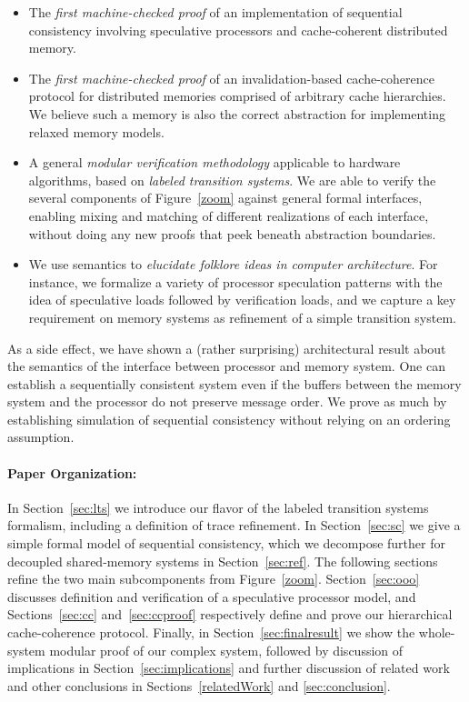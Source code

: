 \begin{itemize} 

\item The \emph{first machine-checked proof} of an implementation of sequential
  consistency involving speculative processors and cache-coherent distributed
  memory.

\item The \emph{first machine-checked proof} of an invalidation-based
  cache-coherence protocol for distributed memories comprised of arbitrary
  cache hierarchies. We believe such a memory is also the correct abstraction for
  implementing relaxed memory models.

\item A general \emph{modular verification methodology} applicable to hardware
  algorithms, based on \emph{labeled transition systems}.  We are able to verify
  the several components of Figure~\ref{zoom} against general formal interfaces,
  enabling mixing and matching of different realizations of each interface,
  without doing any new proofs that peek beneath abstraction boundaries.

\item We use semantics to \emph{elucidate folklore ideas in computer architecture}.
  For instance, we formalize a variety of processor speculation patterns with
  the idea of speculative loads followed by verification loads, and we capture
  a key requirement on memory systems as refinement of a simple transition
  system.

\end{itemize}

As a side effect, we %
have shown a (rather surprising) architectural result about the semantics of
the interface between processor and memory system. One can establish a
sequentially consistent system even if the buffers between the memory system
and the processor do not preserve message order. We prove as much by
establishing simulation of sequential consistency without relying on an
ordering assumption.

\paragraph{Paper Organization:} In Section~\ref{sec:lts} we introduce
our flavor of the labeled transition systems formalism,
including a definition of trace refinement. In
Section~\ref{sec:sc} we give a simple formal model of sequential consistency,
which we decompose further for decoupled shared-memory systems in Section~\ref{sec:ref}.
The following sections refine the two main subcomponents from Figure~\ref{zoom}.
Section~\ref{sec:ooo} discusses definition and verification of a
speculative processor model, and Sections~\ref{sec:cc} and~\ref{sec:ccproof}
respectively define and prove our hierarchical cache-coherence protocol.
Finally, in Section~\ref{sec:finalresult} we show
the whole-system modular proof of our complex system, followed by
discussion of implications in Section~\ref{sec:implications}
and further discussion of related work and other conclusions in
Sections~\ref{relatedWork} and \ref{sec:conclusion}.


